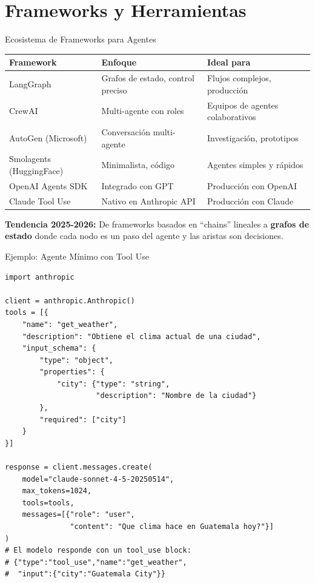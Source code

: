 \documentclass[aspectratio=169]{beamer}
\begin{document}
\section{Frameworks y Herramientas}
\begin{frame}{Ecosistema de Frameworks para Agentes}
    \begin{table}[]
        \centering
        \renewcommand{\arraystretch}{1.3}
        \scriptsize
        \begin{tabular}{p{2.5cm} p{4cm} p{4.5cm}}
            \toprule
            \textbf{Framework} & \textbf{Enfoque} & \textbf{Ideal para} \\
            \midrule
            LangGraph & Grafos de estado, control preciso & Flujos complejos, producción \\
            CrewAI & Multi-agente con roles & Equipos de agentes colaborativos \\
            AutoGen (Microsoft) & Conversación multi-agente & Investigación, prototipos \\
            Smolagents (HuggingFace) & Minimalista, código & Agentes simples y rápidos \\
            OpenAI Agents SDK & Integrado con GPT & Producción con OpenAI \\
            Claude Tool Use & Nativo en Anthropic API & Producción con Claude \\
            \bottomrule
        \end{tabular}
    \end{table}
    
    \vspace{0.2cm}
    \textbf{Tendencia 2025-2026:} De frameworks basados en ``chains'' lineales a \textbf{grafos de estado} donde cada nodo es un paso del agente y las aristas son decisiones.
\end{frame}
\begin{frame}[fragile]{Ejemplo: Agente Mínimo con Tool Use}
\begin{lstlisting}[style=codestyle]
import anthropic

client = anthropic.Anthropic()
tools = [{
    "name": "get_weather",
    "description": "Obtiene el clima actual de una ciudad",
    "input_schema": {
        "type": "object",
        "properties": {
            "city": {"type": "string",
                     "description": "Nombre de la ciudad"}
        },
        "required": ["city"]
    }
}]

response = client.messages.create(
    model="claude-sonnet-4-5-20250514",
    max_tokens=1024,
    tools=tools,
    messages=[{"role": "user",
               "content": "Que clima hace en Guatemala hoy?"}]
)
# El modelo responde con un tool_use block:
# {"type":"tool_use","name":"get_weather",
#  "input":{"city":"Guatemala City"}}
\end{lstlisting}
\end{frame}
\end{document}
